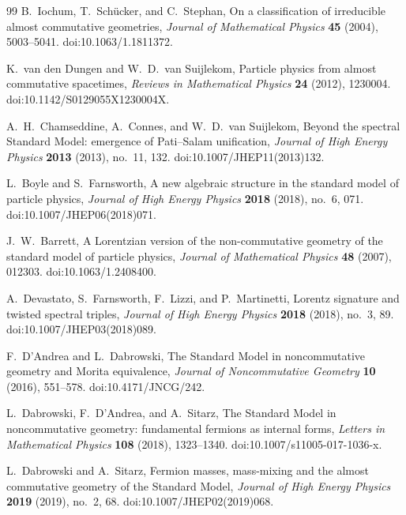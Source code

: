 \documentclass[11pt]{article}
\numberwithin{equation}{section}
\theoremstyle{definition}
\theoremstyle{remark}
\begin{document}
\begin{thebibliography}{99}
B.~Iochum, T.~Sch\"ucker, and C.~Stephan,
\newblock On a classification of irreducible almost commutative geometries,
\newblock \emph{Journal of Mathematical Physics} \textbf{45} (2004),
5003--5041.
\newblock doi:10.1063/1.1811372.

K.~van den Dungen and W.~D.~van Suijlekom,
\newblock Particle physics from almost commutative spacetimes,
\newblock \emph{Reviews in Mathematical Physics} \textbf{24} (2012),
1230004.
\newblock doi:10.1142/S0129055X1230004X.

A.~H.~Chamseddine, A.~Connes, and W.~D.~van Suijlekom,
\newblock Beyond the spectral Standard Model: emergence of Pati--Salam
unification,
\newblock \emph{Journal of High Energy Physics} \textbf{2013} (2013),
no.~11, 132.
\newblock doi:10.1007/JHEP11(2013)132.

L.~Boyle and S.~Farnsworth,
\newblock A new algebraic structure in the standard model of particle physics,
\newblock \emph{Journal of High Energy Physics} \textbf{2018} (2018), no.~6, 071.
\newblock doi:10.1007/JHEP06(2018)071.

J.~W.~Barrett,
\newblock A Lorentzian version of the non-commutative geometry of the standard
model of particle physics,
\newblock \emph{Journal of Mathematical Physics} \textbf{48} (2007), 012303.
\newblock doi:10.1063/1.2408400.

A.~Devastato, S.~Farnsworth, F.~Lizzi, and P.~Martinetti,
\newblock Lorentz signature and twisted spectral triples,
\newblock \emph{Journal of High Energy Physics} \textbf{2018} (2018),
no.~3, 89.
\newblock doi:10.1007/JHEP03(2018)089.

F.~D'Andrea and L.~Dabrowski,
\newblock The Standard Model in noncommutative geometry and Morita equivalence,
\newblock \emph{Journal of Noncommutative Geometry} \textbf{10} (2016),
551--578.
\newblock doi:10.4171/JNCG/242.

L.~Dabrowski, F.~D'Andrea, and A.~Sitarz,
\newblock The Standard Model in noncommutative geometry: fundamental fermions
as internal forms,
\newblock \emph{Letters in Mathematical Physics} \textbf{108} (2018),
1323--1340.
\newblock doi:10.1007/s11005-017-1036-x.

L.~Dabrowski and A.~Sitarz,
\newblock Fermion masses, mass-mixing and the almost commutative geometry of
the Standard Model,
\newblock \emph{Journal of High Energy Physics} \textbf{2019} (2019),
no.~2, 68.
\newblock doi:10.1007/JHEP02(2019)068.


\end{thebibliography}
\end{document}
